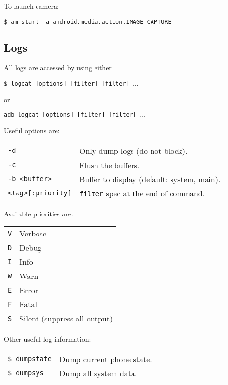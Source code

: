 \documentclass[11pt,landscape,a4paper]{article}
\begin{document}
\begin{multicols}{3}
{To launch camera:

\vspace*{1mm}

\texttt{\$ am start -a android.media.action.IMAGE\_CAPTURE}
}

\subsection{Logs}

All logs are accessed by using either 

\texttt{\$ logcat [options] [filter] [filter] $\ldots$} 

or 

\texttt{adb logcat [options] [filter] [filter] $\ldots$}

\vspace*{2mm}

Useful options are:

\begin{tabular}{@{}ll@{}}
\texttt{-d} & Only dump logs (do not block).\\
\texttt{-c} & Flush the buffers.\\
\texttt{-b <buffer>} & Buffer to display (default: system, main).\\
\texttt{<tag>[:priority]} & \texttt{filter} spec at the end of command.\\
\end{tabular}

\vspace*{2mm}

Available priorities are:

\begin{addmargin}{10mm}
\begin{tabular}{@{}ll@{}}
\texttt{V} & Verbose\\
\texttt{D} & Debug\\
\texttt{I} & Info\\
\texttt{W} & Warn\\
\texttt{E} & Error\\
\texttt{F} & Fatal\\
\texttt{S} & Silent (suppress all output)\\
\end{tabular}
\end{addmargin}

\vspace*{2mm}

Other useful log information:
\begin{tabular}{@{}ll@{}}
\texttt{\$ dumpstate} & Dump current phone state.\\
\texttt{\$ dumpsys} & Dump all system data.\\
\end{tabular}


\end{multicols}
\end{document}
